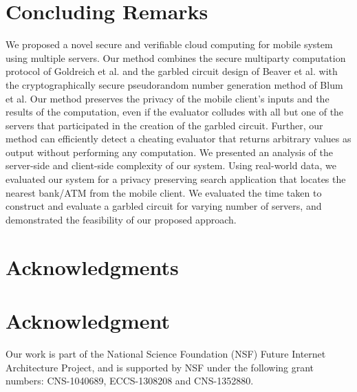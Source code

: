 \documentclass[10pt,journal,cspaper,compsoc]{IEEEtran}
\begin{document}
 \section{Concluding Remarks}
\label{sec_conclusion}

We proposed a novel secure and verifiable cloud computing for mobile system using multiple servers. Our method combines the secure multiparty computation protocol of Goldreich et al. and the garbled circuit design of Beaver et al. with the cryptographically secure pseudorandom number generation method of Blum et al. Our method preserves the privacy of the mobile client's inputs and the results of the computation, even if the evaluator colludes with all but one of the servers that participated in the creation of the garbled circuit. Further, our method can efficiently detect a cheating evaluator that returns arbitrary values as output without performing any computation. We presented an analysis of the server-side and client-side complexity of our system. Using real-world data, we evaluated our system for a privacy preserving search application that locates the nearest bank/ATM from the mobile client. We evaluated the time taken to construct and evaluate a garbled circuit for varying number of servers, and demonstrated the feasibility of our proposed approach.
 











\ifCLASSOPTIONcompsoc
\section*{Acknowledgments}
\else
\section*{Acknowledgment}
\fi


Our work is part of the National Science Foundation (NSF) Future Internet Architecture Project, and is supported by NSF under the following grant numbers: CNS-1040689, ECCS-1308208 and CNS-1352880.

\ifCLASSOPTIONcaptionsoff
  \newpage
\fi
















\end{document}
